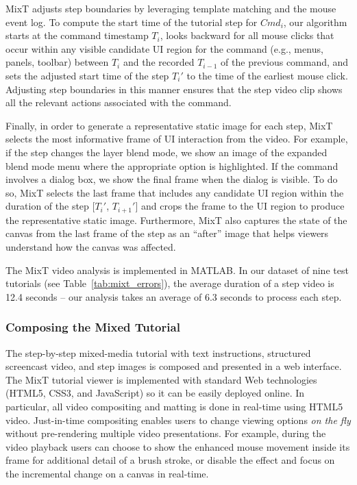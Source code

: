 MixT adjusts step boundaries by leveraging template matching and the mouse event log. To compute the start time of the tutorial step for $Cmd_i$, our algorithm starts at the command timestamp $T_i$, looks backward for all mouse clicks that occur within any visible candidate UI region for the command (e.g., menus, panels, toolbar) between $T_i$ and the recorded $T_{i-1}$ of the previous command, and sets the adjusted start time of the step $T_i'$ to the time of the earliest mouse click. Adjusting step boundaries in this manner ensures that the step video clip shows all the relevant actions associated with the command.

Finally, in order to generate a representative static image for each step, MixT selects the most informative frame of UI interaction from the video. For example, if the step changes the layer blend mode, we show an image of the expanded blend mode menu where the appropriate option is highlighted. If the command involves a dialog box, we show the final frame when the dialog is visible. To do so, MixT selects the last frame that includes any candidate UI region within the duration of the step [$T_i'$, $T_{i+1}'$] and crops the frame to the UI region to produce the representative static image. Furthermore, MixT also captures the state of the canvas from the last frame of the step as an ``after'' image that helps viewers understand how the canvas was affected.

The MixT video analysis is implemented in MATLAB. In our dataset of nine test tutorials (see Table~\ref{tab:mixt_errors}), the average duration of a step video is 12.4 seconds – our analysis takes an average of 6.3 seconds to process each step.

\subsubsection{Composing the Mixed Tutorial}
The step-by-step mixed-media tutorial with text instructions, structured screencast video, and step images is composed and presented in a web interface. The MixT tutorial viewer is implemented with standard Web technologies (HTML5, CSS3, and JavaScript) so it can be easily deployed online. In particular, all video compositing and matting is done in real-time using HTML5 video. Just-in-time compositing enables users to change viewing options \emph{on the fly} without pre-rendering multiple video presentations. For example, during the video playback users can choose to show the enhanced mouse movement inside its frame for additional detail of a brush stroke, or disable the effect and focus on the incremental change on a canvas in real-time.
